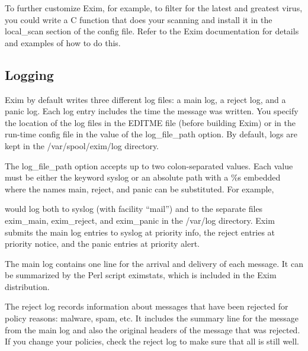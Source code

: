 To further customize Exim, for example, to filter for the latest and
greatest virus, you could write a C function that does your scanning and
install it in the {local\_scan} section of the config file. Refer to the
Exim documentation for details and examples of how to do this.

\protect\hypertarget{part0026_split_055.html}{}{}

\hypertarget{part0026_split_055.htmlux5cux23_idContainer1247}{}
\hypertarget{part0026_split_055.htmlux5cux23calibre_pb_54}{%
\subsection[Logging]{\texorpdfstring{\protect\hypertarget{part0026_split_055.htmlux5cux23_idTextAnchor1161}{}{}Logging}{Logging}}\label{part0026_split_055.htmlux5cux23calibre_pb_54}}

\protect\hypertarget{part0026_split_055.htmlux5cux23_idIndexMarker2670}{}{}Exim
by default writes three different log files: a main log, a reject log,
and a panic log. Each log entry includes the time the message was
written. You specify the location of the log files in the {EDITME} file
(before building Exim) or in the run-time config file in the value of
the {log\_file\_path} option. By default, logs are kept in the
\protect\hypertarget{part0026_split_055.htmlux5cux23_idIndexMarker2671}{}{}{/var/spool/exim/log}
directory.

The {log\_file\_path} option accepts up to two colon-separated values.
Each value must be either the keyword {syslog} or an absolute path with
a {\%s} embedded where the names {main}, {reject}, and {panic} can be
substituted. For
example,\protect\hypertarget{part0026_split_055.htmlux5cux23_idIndexMarker2672}{}{}


would log both to syslog (with facility ``mail'') and to the separate
files {exim\_main}, {exim\_reject}, and {exim\_panic} in the {/var/log}
directory. Exim submits the {main} log entries to syslog at priority
info, the {reject} entries at priority notice, and the {panic} entries
at priority alert.

The {main} log contains one line for the arrival and delivery of each
message. It can be summarized by the Perl script {eximstats}, which is
included in the Exim distribution.

The {reject} log records information about messages that have been
rejected for policy reasons: malware, spam, etc. It includes the summary
line for the message from the {main} log and also the original headers
of the message that was rejected. If you change your policies, check the
{reject} log to make sure that all is still well.

